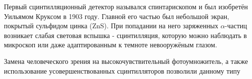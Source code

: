 Первый сцинтилляционный детектор назывался спинтарископом и был изобретён Уильямом Круксом в 1903 году. Главной его частью был небольшой экран, покрытый сульфидом цинка (ZnS). При попадании на него заряженных $\alpha$-частиц возникает слабая световая вспышка - сцинтилляция, которую можно наблюдать в микроскоп или даже адаптированным к темноте невооружёным глазом.\par
Замена человеческого зрения на высокочувствительный фотоумножитель, а также использование усовершенствованных сцинтилляторов позволили данному типу 
